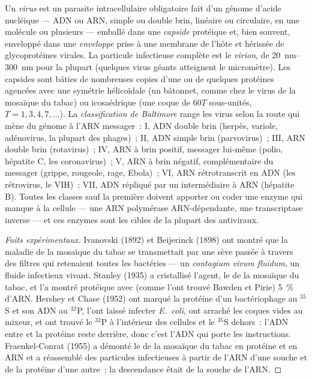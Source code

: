 \begin{definition}[Virus]\label{def:b3:virology:virus}
Un \emph{virus} est un parasite intracellulaire obligatoire fait d'un
génome d'acide nucléique --- ADN ou ARN, simple ou double brin,
linéaire ou circulaire, en une molécule ou plusieurs --- emballé dans
une \emph{capside} protéique et, bien souvent, enveloppé dans une
\emph{enveloppe} prise à une membrane de l'hôte et hérissée de
glycoprotéines virales. La particule infectieuse complète est le
\emph{virion}, de \qtyrange{20}{300}{nm} pour la plupart (quelques
virus géants atteignent le micromètre). Les capsides sont bâties de
nombreuses copies d'une ou de quelques protéines agencées avec une
symétrie hélicoïdale (un bâtonnet, comme chez le virus de la mosaïque
du tabac) ou icosaédrique (une coque de $60T$ sous-unités,
$T = 1, 3, 4, 7,\dots$). La \emph{classification de Baltimore} range
les virus selon la route qui mène du génome à l'ARN messager~: I, ADN
double brin (herpès, variole, adénovirus, la plupart des phages)~; II,
ADN simple brin (parvovirus)~; III, ARN double brin (rotavirus)~; IV,
ARN à brin positif, messager lui-même (polio, hépatite C, les
coronavirus)~; V, ARN à brin négatif, complémentaire du messager
(grippe, rougeole, rage, Ebola)~; VI, ARN rétrotranscrit en ADN (les
rétrovirus, le VIH)~; VII, ADN répliqué par un intermédiaire à ARN
(hépatite B). Toutes les classes sauf la première doivent apporter ou
coder une enzyme qui manque à la cellule --- une ARN polymérase
ARN-dépendante, une transcriptase inverse --- et ces enzymes sont les
cibles de la plupart des antiviraux.
\end{definition}

\begin{proof}[Faits expérimentaux]
Ivanovski (1892) et Beijerinck (1898) ont montré que la maladie de la
mosaïque du tabac se transmettait par une sève passée à travers des
filtres qui retenaient toutes les bactéries --- un \emph{contagium
vivum fluidum}, un fluide infectieux vivant. Stanley (1935) a
cristallisé l'agent, le  de la mosaïque du tabac, et l'a montré
protéique avec (comme l'ont trouvé Bawden et Pirie) \qty{5}{\%} d'ARN.
Hershey et Chase (1952) ont marqué la protéine d'un bactériophage au
$^{35}$S et son ADN au $^{32}$P, l'ont laissé infecter \emph{E.~coli},
ont arraché les coques vides au mixeur, et ont trouvé le $^{32}$P à
l'intérieur des cellules et le $^{35}$S dehors~: l'ADN entre et la
protéine reste derrière, donc c'est l'ADN qui porte les instructions.
Fraenkel-Conrat (1955) a démonté le  de la mosaïque du tabac en
protéine et en ARN et a réassemblé des particules infectieuses à partir
de l'ARN d'une souche et de la protéine d'une autre~; la descendance
était de la souche de l'ARN.
\end{proof}

